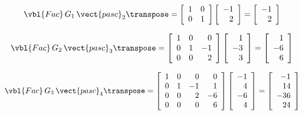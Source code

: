 \[
 \vbl{Fac}\,G_1\,\vect{pasc}_2\transpose =
 \left[\begin{array}{rr}
   1 & 0 \\
   0 & 1 \\
 \end{array}\right]
 \left[\begin{array}{r}
   -1 \\ 2 \\
 \end{array}\right]
 =
 \left[\begin{array}{r}
   -1 \\ 2 \\
 \end{array}\right]
\]

\[
 \vbl{Fac}\,G_2\,\vect{pasc}_3\transpose =
 \left[\begin{array}{rrr}
   1 & 0 &  0 \\
   0 & 1 & -1 \\
   0 & 0 &  2 \\
 \end{array}\right]
 \left[\begin{array}{r}
    1 \\ -3 \\ 3 \\
 \end{array}\right]
 =
 \left[\begin{array}{r}
    1 \\ -6 \\ 6 \\
 \end{array}\right]
\]

\[
 \vbl{Fac}\,G_3\,\vect{pasc}_4\transpose =
 \left[\begin{array}{rrrr}
   1 & 0 &  0 &  0 \\
   0 & 1 & -1 &  1 \\
   0 & 0 &  2 & -6 \\
   0 & 0 &  0 &  6 \\
 \end{array}\right]
 \left[\begin{array}{r}
   -1 \\ 4 \\ -6 \\ 4 \\
 \end{array}\right]
 =
 \left[\begin{array}{r}
   -1 \\ 14 \\ -36 \\ 24 \\
 \end{array}\right]
\]

